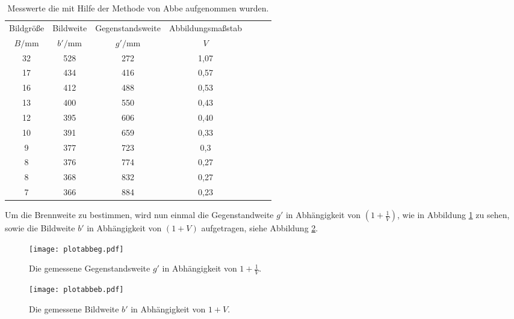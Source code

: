 \begin{table}
    \centering
    \caption{Messwerte die mit Hilfe der Methode von Abbe aufgenommen wurden.}
    \label{tab:abbe}
    \begin{tabular}{c c c c c c c}
    \toprule
    Bildgröße  & Bildweite &Gegenstandsweite & Abbildungsmaßstab\\
     $B/\si{\milli\meter}$ &$b'/\si{\milli\meter}$ & $g'/\si{\milli\meter}$ &$V$\\
    \midrule
    32  &  528  &  272  & 1,07\\
    17  &  434  &  416  & 0,57\\
    16  &  412  &  488  & 0,53\\
    13  &  400  &  550  & 0,43\\
    12  &  395  &  606  & 0,40\\
    10  &  391  &  659  & 0,33\\
    9   &  377  &  723  & 0,3\\
    8   &  376  &  774  & 0,27\\
    8   &  368  &  832  & 0,27\\
    7   &  366  &  884  & 0,23\\
    \bottomrule
  \end{tabular}
\end{table}
\FloatBarrier
Um die Brennweite zu bestimmen, wird nun einmal
die Gegenstandweite $g'$ in Abhängigkeit von
  $(1+ \frac{1}{V})$, wie in Abbildung \ref{fig:Plotg'} zu sehen,
sowie die Bildweite $b'$ in Abhängigkeit von
$(1+V)$ aufgetragen, siehe Abbildung \ref{fig:Plotb'}.


\begin{figure}
  \centering
  \texttt{[image: plotabbeg.pdf]}
  \caption{Die gemessene Gegenstandsweite $g'$ in Abhängigkeit von $1+\frac{1}{V}$.}
  \label{fig:Plotg'}
\end{figure}

\begin{figure}
 \centering
 \texttt{[image: plotabbeb.pdf]}
 \caption{Die gemessene Bildweite $b'$ in Abhängigkeit von $1+V$.}
 \label{fig:Plotb'}
\end{figure}
\FloatBarrier

